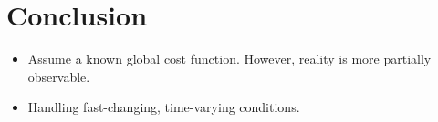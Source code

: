 \section{Conclusion} \label{sec:conclusion}
\begin{itemize}
    \item Assume a known global cost function. However, reality is more partially observable.
    \item Handling fast-changing, time-varying conditions.
\end{itemize}